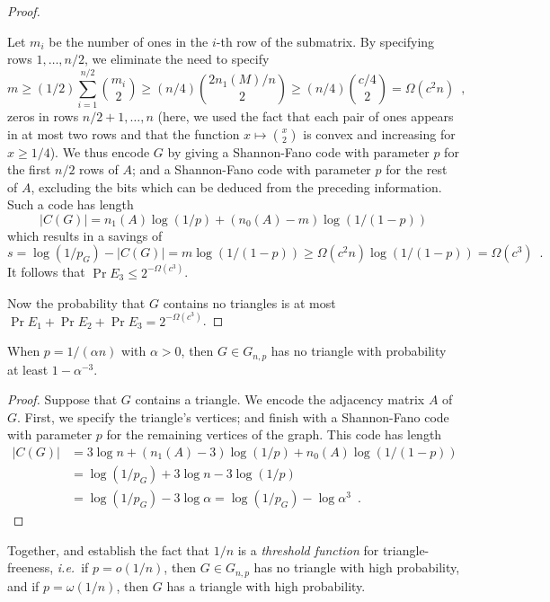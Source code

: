 \documentclass[format=acmsmall, review=false, screen=true]{acmart}
\begin{document}
\begin{proof}
\begin{enumerate}
    Let $m_i$ be the number of ones in the $i$-th row of the
    submatrix.  By specifying rows $1,\ldots,n/2$, we eliminate the
    need to specify
    \[
      m \geq (1/2)\sum_{i=1}^{n/2}\binom{m_i}{2} \ge (n/4) \binom{2
        n_1(M)/n}{2} \ge (n/4)\binom{c/4}{2} = \varOmega(c^2n) \enspace ,
    \]
    zeros in rows $n/2+1,\ldots,n$ (here, we used the fact that each
    pair of ones appears in at most two rows and that the
    function $x \mapsto \binom{x}{2}$ is convex and increasing for 
    $x \geq 1/4$).
    We thus encode $G$ by giving a
    Shannon-Fano code with parameter $p$ for the first $n/2$ rows of
    $A$; and a Shannon-Fano code with parameter $p$ for the rest of
    $A$, excluding the bits which can be deduced from the preceding
    information. Such a code has length
    \[
      |C(G)| = n_1(A) \log(1/p) + (n_0(A)-m)\log(1/(1-p))
    \]
    which results in a savings of
    \[
      s = \log(1/p_G) - |C(G)| = m\log(1/(1-p)) \ge
      \varOmega(c^2n)\log(1/(1-p)) = \varOmega(c^3) \enspace . 
    \]
    It follows that $\Pr E_3 \leq 2^{-\varOmega(c^3)}$.
  \end{enumerate}
  Now the probability that $G$ contains no triangles is at most
  $\Pr E_1 + \Pr E_2 + \Pr E_3 = 2^{-\varOmega(c^3)}$. 
\end{proof}

\begin{thm}
  When $p = 1/(\alpha n)$ with $\alpha > 0$, then $G \in G_{n, p}$ 
  has no triangle with
  probability at least $1 - \alpha^{-3}$.
\end{thm}
\begin{proof}
  Suppose that $G$ contains a triangle. We encode the adjacency matrix
  $A$ of $G$. First, we specify the triangle's vertices; and finish
  with a Shannon-Fano code with parameter $p$ for the remaining
  vertices of the graph. This code has length
  \begin{align*}
    |C(G)| &= 3 \log n + (n_1(A) - 3) \log (1/p) + n_0(A) \log (1/(1 - p)) \\
           &= \log (1/p_G) + 3 \log n - 3 \log (1/p) \\
           &= \log (1/p_G) - 3 \log \alpha 
           = \log (1/p_G) - \log \alpha^3 \enspace . 
  \end{align*}
\end{proof}

Together,  and  establish
the fact that $1/n$ is a \emph{threshold function} for
triangle-freeness, \emph{i.e.}~if $p = o(1/n)$, then $G \in G_{n, p}$
has no triangle with high probability, and if $p = \omega(1/n)$, then
$G$ has a triangle with high probability. 
\end{document}
